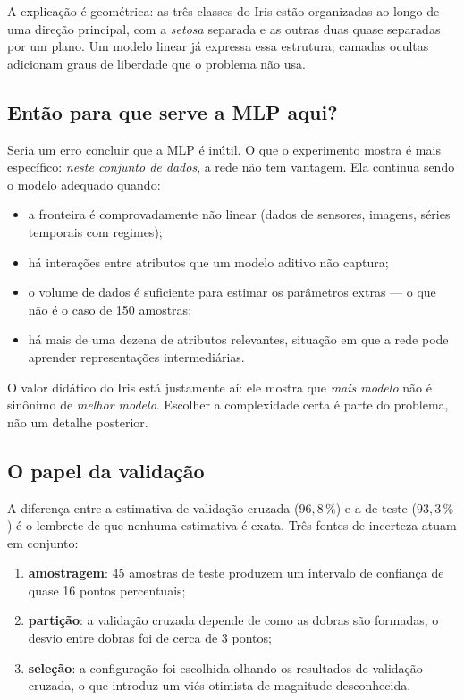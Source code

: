A explicação é geométrica: as três classes do Iris estão organizadas ao longo de uma direção
principal, com a \emph{setosa} separada e as outras duas quase separadas por um plano. Um modelo
linear já expressa essa estrutura; camadas ocultas adicionam graus de liberdade que o problema não
usa.

\subsection{Então para que serve a MLP aqui?}

Seria um erro concluir que a MLP é inútil. O que o experimento mostra é mais específico: \emph{neste
conjunto de dados}, a rede não tem vantagem. Ela continua sendo o modelo adequado quando:

\begin{itemize}
	\item a fronteira é comprovadamente não linear (dados de sensores, imagens, séries temporais
	      com regimes);
	\item há interações entre atributos que um modelo aditivo não captura;
	\item o volume de dados é suficiente para estimar os parâmetros extras --- o que não é o caso
	      de 150 amostras;
	\item há mais de uma dezena de atributos relevantes, situação em que a rede pode aprender
	      representações intermediárias.
\end{itemize}

O valor didático do Iris está justamente aí: ele mostra que \emph{mais modelo} não é sinônimo de
\emph{melhor modelo}. Escolher a complexidade certa é parte do problema, não um detalhe posterior.

\subsection{O papel da validação}

A diferença entre a estimativa de validação cruzada ($96{,}8\,\%$) e a de teste ($93{,}3\,\%$) é o
lembrete de que nenhuma estimativa é exata. Três fontes de incerteza atuam em conjunto:

\begin{enumerate}
	\item \textbf{amostragem}: 45 amostras de teste produzem um intervalo de confiança de quase 16
	      pontos percentuais;
	\item \textbf{partição}: a validação cruzada depende de como as dobras são formadas; o desvio
	      entre dobras foi de cerca de 3 pontos;
	\item \textbf{seleção}: a configuração foi escolhida olhando os resultados de validação
	      cruzada, o que introduz um viés otimista de magnitude desconhecida.
\end{enumerate}

